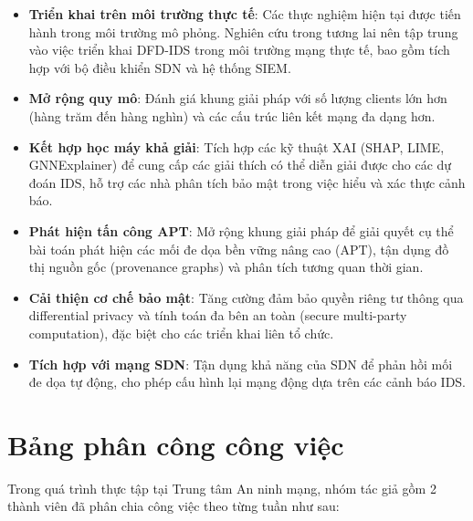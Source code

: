 \begin{itemize}
    \item \textbf{Triển khai trên môi trường thực tế}: Các thực nghiệm hiện tại được tiến hành trong môi trường mô phỏng. Nghiên cứu trong tương lai nên tập trung vào việc triển khai DFD-IDS trong môi trường mạng thực tế, bao gồm tích hợp với bộ điều khiển SDN và hệ thống SIEM.
    \item \textbf{Mở rộng quy mô}: Đánh giá khung giải pháp với số lượng clients lớn hơn (hàng trăm đến hàng nghìn) và các cấu trúc liên kết mạng đa dạng hơn.
    \item \textbf{Kết hợp học máy khả giải}: Tích hợp các kỹ thuật XAI (SHAP, LIME, GNNExplainer) để cung cấp các giải thích có thể diễn giải được cho các dự đoán IDS, hỗ trợ các nhà phân tích bảo mật trong việc hiểu và xác thực cảnh báo.
    \item \textbf{Phát hiện tấn công APT}: Mở rộng khung giải pháp để giải quyết cụ thể bài toán phát hiện các mối đe dọa bền vững nâng cao (APT), tận dụng đồ thị nguồn gốc (provenance graphs) và phân tích tương quan thời gian.
    \item \textbf{Cải thiện cơ chế bảo mật}: Tăng cường đảm bảo quyền riêng tư thông qua differential privacy và tính toán đa bên an toàn (secure multi-party computation), đặc biệt cho các triển khai liên tổ chức.
    \item \textbf{Tích hợp với mạng SDN}: Tận dụng khả năng của SDN để phản hồi mối đe dọa tự động, cho phép cấu hình lại mạng động dựa trên các cảnh báo IDS.
\end{itemize}

\pagebreak

\appendix
\chapter{Bảng phân công công việc}

Trong quá trình thực tập tại Trung tâm An ninh mạng, nhóm tác giả gồm 2 thành viên đã phân chia công việc theo từng tuần như sau:

